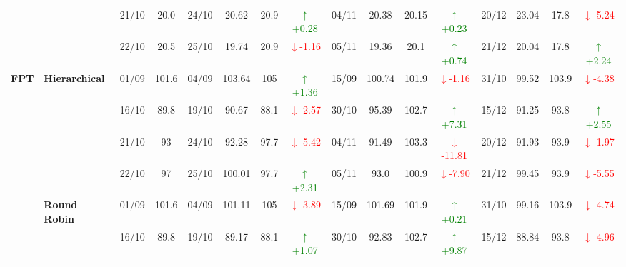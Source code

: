 \documentclass{ieeeaccess}
\begin{document}
{\begin{longtable}{llcc|cccc|cccc|cccc}
&
& 21/10 & 20.0 & 24/10 & 20.62 & 20.9 & \textcolor{green}{\(\uparrow\)+0.28} & 04/11 & 20.38 & 20.15 & \textcolor{green}{\(\uparrow\)+0.23} & 20/12 & 23.04 & 17.8 & \textcolor{red}{\(\downarrow\)-5.24} \\

&
& 22/10 & 20.5 & 25/10 & 19.74 & 20.9 & \textcolor{red}{\(\downarrow\)-1.16} & 05/11 & 19.36 & 20.1 & \textcolor{green}{\(\uparrow\)+0.74} & 21/12 & 20.04 & 17.8 & \textcolor{green}{\(\uparrow\)+2.24} \\
\midrule



\multirow{12}{*}{\textbf{FPT}} 
& \textbf{Hierarchical}
& 01/09 & 101.6 & 04/09 & 103.64 & 105 & \textcolor{green}{\(\uparrow\)+1.36} & 15/09 & 100.74 & 101.9 & \textcolor{red}{\(\downarrow\)-1.16} & 31/10 & 99.52 & 103.9 & \textcolor{red}{\(\downarrow\)-4.38} \\

&
& 16/10 & 89.8 & 19/10 & 90.67 & 88.1 & \textcolor{red}{\(\downarrow\)-2.57} & 30/10 & 95.39 & 102.7 & \textcolor{green}{\(\uparrow\)+7.31} & 15/12 & 91.25 & 93.8 & \textcolor{green}{\(\uparrow\)+2.55} \\

&
& 21/10 & 93 & 24/10 & 92.28 & 97.7 & \textcolor{red}{\(\downarrow\)-5.42} & 04/11 & 91.49 & 103.3 & \textcolor{red}{\(\downarrow\)-11.81} & 20/12 & 91.93 & 93.9 & \textcolor{red}{\(\downarrow\)-1.97} \\

&
& 22/10 & 97 & 25/10 & 100.01 & 97.7 & \textcolor{green}{\(\uparrow\)+2.31} & 05/11 & 93.0 & 100.9 & \textcolor{red}{\(\downarrow\)-7.90} & 21/12 & 99.45 & 93.9 & \textcolor{red}{\(\downarrow\)-5.55} \\
\cmidrule(lr){2-16}


& \textbf{Round Robin}
& 01/09 & 101.6 & 04/09 & 101.11 & 105 & \textcolor{red}{\(\downarrow\)-3.89} & 15/09 & 101.69 & 101.9 & \textcolor{green}{\(\uparrow\)+0.21} & 31/10 & 99.16 & 103.9 & \textcolor{red}{\(\downarrow\)-4.74} \\

&
& 16/10 & 89.8 & 19/10 & 89.17 & 88.1 & \textcolor{green}{\(\uparrow\)+1.07} & 30/10 & 92.83 & 102.7 & \textcolor{green}{\(\uparrow\)+9.87} & 15/12 & 88.84 & 93.8 & \textcolor{red}{\(\downarrow\)-4.96} \\


\end{longtable}}
\end{document}

